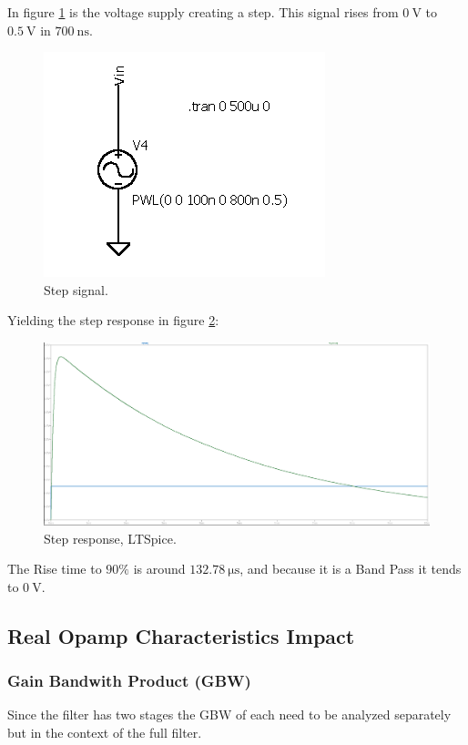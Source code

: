 In figure \ref{fig:StepSig} is the voltage supply creating a step. This signal rises from $\SI{0}{\volt}$ to $\SI{0.5}{\volt}$ in $\SI{700}{\nano\second}$.

\begin{figure}[H]
    \centering
    \includegraphics*[scale = 0.5]{Images/StepSig.png}
    \caption{Step signal.}
    \label{fig:StepSig}
\end{figure}


Yielding the step response in figure \ref{fig:StepLT}:

\begin{figure}[H]
    \centering
    \includegraphics*[scale = 0.25]{Images/StepResLT.png}
    \caption{Step response, LTSpice.}
    \label{fig:StepLT}
\end{figure}

The Rise time to $90\%$ is around $\SI{132.78}{\micro\second}$, and because it is a Band Pass it tends to $\SI{0}{\volt}$.

\subsection{Real Opamp Characteristics Impact}


\subsubsection{Gain Bandwith Product (GBW)}

Since the filter has two stages the GBW of each need to be analyzed separately but in the context of the full filter.
